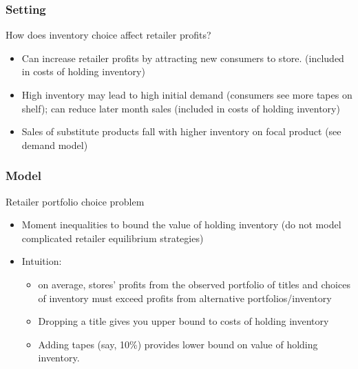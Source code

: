 
\begin{frame}
\frametitle{Setting}

How does inventory choice affect retailer profits?

\begin{itemize}
\item Can increase retailer profits by attracting new consumers to store.
(included in costs of holding inventory)

\item High inventory may lead to high initial demand (consumers see more
tapes on shelf); can reduce later month sales (included in costs of holding
inventory)

\item Sales of substitute products fall with higher inventory on focal
product (see demand model)
\end{itemize}
\end{frame}


\begin{frame}
\frametitle{Model}

Retailer portfolio choice problem

\begin{itemize}
\item Moment inequalities to bound the value of holding inventory (do not
model complicated retailer equilibrium strategies)

\item Intuition:

\begin{itemize}
\item on average, stores' profits from the observed portfolio of
titles and choices of inventory must exceed profits from alternative
portfolios/inventory

\item Dropping a title gives you upper bound to costs of holding inventory

\item Adding tapes (say, 10\%) provides lower bound on value of holding
inventory.
\end{itemize}

\end{itemize}
\end{frame}

